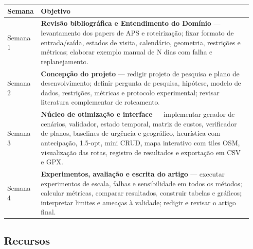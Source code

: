\documentclass[11pt,a4paper]{article}
\newcounter{none} %
\begin{document}
{\def\LTcaptype{none} %
\begin{longtable}[]{@{}>{\raggedright\arraybackslash}p{}>{\raggedright\arraybackslash}p{}@{}}
\toprule\noalign{}
Semana & Objetivo \\
\midrule\noalign{}
\endhead%
\bottomrule\noalign{}
\endlastfoot%
Semana 1 & \textbf{Revisão bibliográfica e Entendimento do Domínio} ---
levantamento dos papers de APS e roteirização; fixar formato de
entrada/saída, estados de visita, calendário, geometria, restrições e
métricas; elaborar exemplo manual de N dias com falha e
replanejamento. \\
Semana 2 & \textbf{Concepção do projeto} --- redigir projeto de pesquisa
e plano de desenvolvimento; definir pergunta de pesquisa, hipótese,
modelo de dados, restrições, métricas e protocolo experimental; revisar
literatura complementar de roteamento. \\
Semana 3 & \textbf{Núcleo de otimização e interface} --- implementar
gerador de cenários, validador, estado temporal, matriz de custos,
verificador de planos, baselines de urgência e geográfico, heurística
com antecipação, 1.5-opt, mini CRUD, mapa interativo com tiles OSM,
visualização das rotas, registro de resultados e exportação em CSV e
GPX. \\
Semana 4 & \textbf{Experimentos, avaliação e escrita do artigo} ---
executar experimentos de escala, falhas e sensibilidade em todos os
métodos; calcular métricas, comparar resultados, construir tabelas e
gráficos; interpretar limites e ameaças à validade; redigir e revisar o
artigo final. \\
\end{longtable}
}

\subsection{Recursos}\label{recursos}
\end{document}
